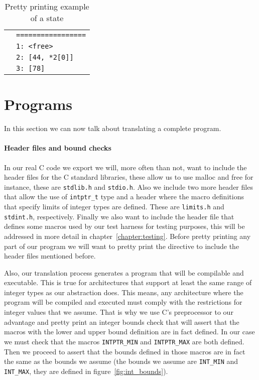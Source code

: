 \begin{table}[h!]
\begin{tabular}{|l|l|}
                                                                                                               & \verb|=================| \\
                                                                                                               & \verb|1: <free>| \\
                                                                                                               & \verb|2: [44, *2[0]]| \\
                                                                                                               & \verb|3: [78]| \\
  \hline
\end{tabular}

\caption{Pretty printing example of a state}
\label{tab:pretty_simp_state}
\end{table}


\section{Programs}

In this section we can now talk about translating a complete program.

\paragraph{Header files and bound checks}
In our real C code we export we will, more often than not, want to include the header files for the C standard libraries, these allow us to use malloc and free for instance, these are \verb|stdlib.h| and \verb|stdio.h|.
Also we include two more header files that allow the use of \verb|intptr_t| type and a header where the macro definitions that specify limits of integer types are defined.
These are \verb|limits.h| and \verb|stdint.h|, respectively.
Finally we also want to include the header file that defines some macros used by our test harness for testing purposes, this will be addressed in more detail in chapter~\ref{chapter:testing}.
Before pretty printing any part of our program we will want to pretty print the directive to include the header files mentioned before.


Also, our translation process generates a program that will be compilable and executable.
This is true for architectures that support at least the same range of integer types as our abstraction does.
This means, any architecture where the program will be compiled and executed must comply with the restrictions for integer values that we assume.
That is why we use C's preprocessor to our advantage and pretty print an integer bounds check that will assert that the macros with the lower and upper bound definition are in fact defined.
In our case we must check that the macros \verb|INTPTR_MIN| and \verb|INTPTR_MAX| are both defined.
Then we proceed to assert that the bounds defined in those macros are in fact the same as the bounds we assume (the bounds we assume are \verb|INT_MIN| and \verb|INT_MAX|, they are defined in figure~\ref{fig:int_bounds}).


